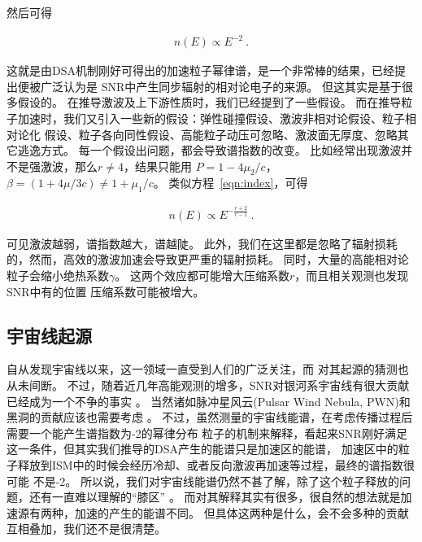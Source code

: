 然后可得

\begin{equation}
  \label{eqn:spec}
    \begin{aligned}
      n(E) \propto E^{-2} \ .
    \end{aligned}
\end{equation}

这就是由DSA机制刚好可得出的加速粒子幂律谱，是一个非常棒的结果，已经提出便被广泛认为是
SNR中产生同步辐射的相对论电子的来源。
但这其实是基于很多假设的。
在推导激波及上下游性质时，我们已经提到了一些假设。
而在推导粒子加速时，我们又引入一些新的假设：弹性碰撞假设、激波非相对论假设、粒子相对论化
假设、粒子各向同性假设、高能粒子动压可忽略、激波面无厚度、忽略其它逃逸方式。
每一个假设出问题，都会导致谱指数的改变。
比如经常出现激波并不是强激波，那么$r\neq4$，结果只能用
$P=1-4\mu_2/c$，$\beta=(1+4\mu/3c)\neq1+\mu_1/c$。
类似方程~\ref{eqn:index}，可得

\begin{equation}
    \begin{aligned}
      n(E) \propto E^{-\frac{r+2}{r-1}} \ .
    \end{aligned}
\end{equation}

可见激波越弱，谱指数越大，谱越陡。
此外，我们在这里都是忽略了辐射损耗的，然而，高效的激波加速会导致更严重的辐射损耗。
同时，大量的高能相对论粒子会缩小绝热系数$\gamma$。
这两个效应都可能增大压缩系数$r$\citep{Ellison2005}，而且相关观测也发现SNR中有的位置
压缩系数可能被增大\citep{Voelk2007}。




\subsection{宇宙线起源}
自从\citet{hess1912beobachtungen}发现宇宙线以来，这一领域一直受到人们的广泛关注，而
对其起源的猜测也从未间断\citep{Reynolds2008a}。
不过，随着近几年高能观测的增多，SNR对银河系宇宙线有很大贡献已经成为一个不争的事实
\citep{Ackermann2013, Joubert2016, Jogler2016}。
当然诸如脉冲星风云(Pulsar Wind Nebula, PWN)和黑洞的贡献应该也需要考虑
\citep{Abeysekara2018, Profumo2018}。
不过，虽然测量的宇宙线能谱，在考虑传播过程后需要一个能产生谱指数为-2的幂律分布
粒子的机制来解释，看起来SNR刚好满足这一条件，但其实我们推导的DSA产生的能谱只是加速区的能谱，
加速区中的粒子释放到ISM中的时候会经历冷却、或者反向激波再加速等过程，最终的谱指数很可能
不是-2。
所以说，我们对宇宙线能谱仍然不甚了解，除了这个粒子释放的问题，还有一直难以理解的“膝区”
\citep{Hoerandel2003}。
而对其解释其实有很多，很自然的想法就是加速源有两种，加速的产生的能谱不同。
但具体这两种是什么，会不会多种的贡献互相叠加，我们还不是很清楚。

